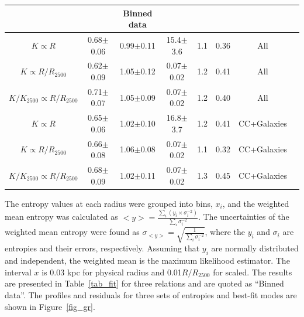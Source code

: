 \documentclass[apjl]{emulateapj}
\begin{document}
\begin{table}
\begin{tabular}{cccccccc}
  \hline
  &   &  Binned data & &\\
  \hline
  $K\propto R$                    & 0.68$\pm$0.06 & 0.99$\pm$0.11 & 15.4$\pm$3.6  & 1.1 & 0.36 & All \\
  $K\propto R/R_{2500}$           & 0.62$\pm$0.09 & 1.05$\pm$0.12 & 0.07$\pm$0.02 & 1.2 & 0.41 & All \\
  $K/K_{2500} \propto R/R_{2500}$ & 0.71$\pm$0.07 & 1.05$\pm$0.09 & 0.07$\pm$0.02 & 1.2 & 0.40 & All \\
  $K\propto R$                    & 0.65$\pm$0.06 & 1.02$\pm$0.10 & 16.8$\pm$3.7 & 1.2 & 0.41 & CC+Galaxies \\
  $K\propto R/R_{2500}$           & 0.66$\pm$0.08 & 1.06$\pm$0.08 & 0.07$\pm$0.02 & 1.1 & 0.32 & CC+Galaxies \\
  $K/K_{2500} \propto R/R_{2500}$ & 0.68$\pm$0.09 & 1.02$\pm$0.11 & 0.07$\pm$0.02 & 1.3 & 0.45 & CC+Galaxies \\
  \hline
  \end{tabular}
\end{table}


The entropy values at each radius were grouped into bins, $x_i$, and the weighted mean entropy was calculated as $< y > = \frac{\sum_i(y_i\times  \sigma_i^{-2})}{\sum_i \sigma_i^{-2}}$. The uncertainties of the weighted mean entropy were found as $\sigma_{<y>} = \sqrt{\frac{1}{\sum_i \sigma_{i}^{-2}}}$, where the $y_i$ and $\sigma_i$ are entropies and their errors, respectively.  Assuming that $y_i$ are normally distributed and independent, the weighted mean is the maximum likelihood estimator. The interval $x$ is $0.03$ kpc for physical radius and 0.01$R/R_{2500}$ for scaled. The results are presented in Table~\ref{tab_fit} {for three relations and are quoted as ``Binned data''}.  The profiles and residuals for three sets of entropies and best-fit modes are shown in Figure~\ref{fig_gr}.   
\end{document}
